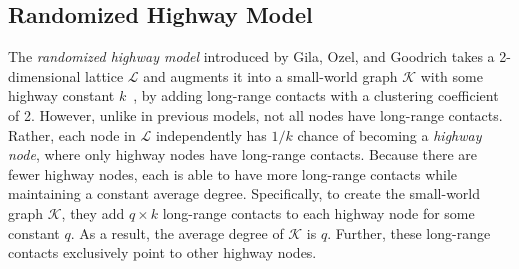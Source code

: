 \subsection{Randomized Highway Model}
%
The \emph{randomized highway model} introduced by 
Gila, Ozel, and Goodrich
takes a
2-dimensional lattice $\mathcal L$ and augments it into a small-world graph
$\mathcal K$ with some highway constant $k$~\cite{gila2023highway},
by adding long-range contacts with a clustering coefficient of 2.
However, unlike in previous models, not all nodes have long-range
contacts.
Rather,
each node
in $\mathcal L$ independently has $1/k$ chance of becoming a {\it highway node},
where only highway nodes have long-range contacts.
Because there are fewer highway nodes, each is able to have more long-range
contacts while maintaining a constant average degree.
Specifically,
to create the small-world graph $\mathcal K$, they add $q \times k$
long-range contacts to each highway node for some constant $q$.
As a result, the average degree of $\mathcal{K}$ is $q$.
Further, these
long-range contacts exclusively point to other highway nodes.



